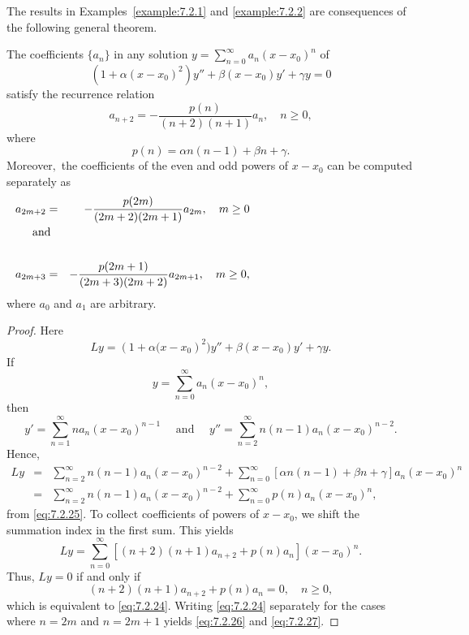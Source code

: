 \documentclass{ximera}
\begin{document}
The results in Examples~\ref{example:7.2.1} and \ref{example:7.2.2} are
consequences of the following general theorem.

\begin{theorem}\label{thmtype:7.2.2}
The coefficients $\{a_n\}$ in any solution
$y=\sum_{n=0}^\infty a_n(x-x_0)^n$ of
\begin{equation}\label{eq:7.2.23}
\left(1+\alpha(x-x_0)^2\right)y''+\beta(x-x_0) y'+\gamma y=0
\end{equation}
satisfy the recurrence relation
\begin{equation}\label{eq:7.2.24}
a_{n+2}=-\frac{p(n)}{(n+2)(n+1)}a_n,\quad  n\geq0,
\end{equation}
where
\begin{equation}\label{eq:7.2.25}
p(n)=\alpha n(n-1) +\beta n+\gamma.
\end{equation}
Moreover$,$ the coefficients of the even and odd powers of $x-x_0$ can
be computed separately as
\begin{eqnarray}
a_{2m+2}&=&-\frac{p(2m)}{(2m+2)(2m+1)}a_{2m},\quad m\geq0\label{eq:7.2.26}\\
\noalign{\mbox{and}}\nonumber\\
a_{2m+3}&=&-\frac{p(2m+1)}{(2m+3)(2m+2)}a_{2m+1},\quad m\geq0, \label{eq:7.2.27}
\end{eqnarray}
where $a_0$ and $a_1$ are arbitrary.
\end{theorem}

\begin{proof}
Here
$$
Ly=\left(1+\alpha(x-x_0\right)^2)y''+\beta(x-x_0) y'+\gamma y.
$$
If
$$
y=\sum_{n=0}^\infty a_n(x-x_0)^n,
$$
then
$$
y'=\sum_{n=1}^\infty na_n(x-x_0)^{n-1}
\quad\mbox{ and }\quad y''=\sum_{n=2}^\infty n(n-1)a_n(x-x_0)^{n-2}.
$$
Hence,
$$
\begin{array}{ccl}
Ly&=&\sum_{n=2}^\infty n(n-1)a_n(x-x_0)^{n-2}+
\sum_{n=0}^\infty \left[\alpha
n(n-1)
+\beta n+\gamma\right]a_n(x-x_0)^n\\
&=&\sum_{n=2}^\infty n(n-1)a_n(x-x_0)^{n-2}+\sum_{n=0}^\infty
p(n)a_n(x-x_0)^n,
\end{array}
$$
from \eqref{eq:7.2.25}.  To collect coefficients of powers of $x-x_0$,
we shift the summation index in the first sum. This yields
$$
Ly=\sum_{n=0}^\infty \left[(n+2)(n+1)a_{n+2}+p(n)a_n\right](x-x_0)^n.
$$
Thus, $Ly=0$ if and only if
$$
(n+2)(n+1)a_{n+2}+p(n)a_n=0,\quad n\geq0,
$$
which is equivalent to \eqref{eq:7.2.24}. Writing \eqref{eq:7.2.24} separately
for the cases where $n=2m$ and $n=2m+1$ yields \eqref{eq:7.2.26} and
\eqref{eq:7.2.27}.
\end{proof}
\end{document}
